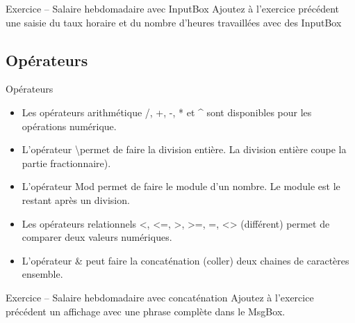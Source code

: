 \documentclass[aspectratio=169,usenames,dvipsnames]{beamer}
\begin{document}
    \begin{frame}{Exercice – Salaire hebdomadaire avec InputBox}
        Ajoutez à l’exercice précédent une saisie du taux horaire et du nombre d’heures travaillées avec des InputBox
    \end{frame}
    \subsection{Opérateurs}
    \begin{frame}{Opérateurs}
        \begin{itemize}
            \item Les opérateurs arithmétique /, +, -, * et \^{} sont disponibles pour les opérations numérique.
            \item L’opérateur \textbackslash permet de faire la division entière. La division entière coupe la partie fractionnaire).
            \item L’opérateur Mod permet de faire le module d’un nombre. Le module est le restant après un division.
            \item Les opérateurs relationnels <, <=, >, >=, =, <> (différent) permet de comparer deux valeurs numériques.
            \item L’opérateur \& peut faire la concaténation (coller) deux chaines de caractères ensemble.
        \end{itemize}
    \end{frame}
    \begin{frame}{Exercice – Salaire hebdomadaire avec concaténation}
        Ajoutez à l’exercice précédent un affichage avec une phrase complète dans le MsgBox.
    \end{frame}
\end{document}
